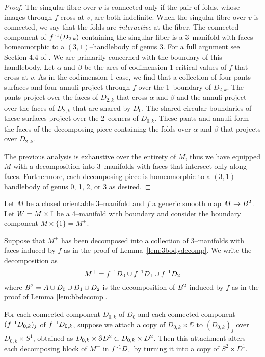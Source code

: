 \begin{proof}
	The singular fibre over $v$ is connected only if the pair of folds, whose images through $f$ cross at $v$, are both indefinite.
	When the singular fibre over $v$ is connected, we say that the folds are \emph{interactive} at the fiber.	
	The connected component of $f^{\,\text{-}1}(D_{2,k})$ containing the singular fiber is a 3--manifold with faces homeomorphic to a $(3,1)$--handlebody of genus 3.
	For a full argument see Section 4.4 of \cite{CostThur08}.
	We are primarily concerned with the boundary of this handlebody.
	Let $\alpha$ and $\beta$ be the arcs of codimension 1 critical values of $f$ that cross at $v$.
	As in the codimension 1 case, we find that a collection of four pants surfaces and four annuli project through $f$ over the 1--boundary of $D_{2,k}$.
	The pants project over the faces of $D_{2,k}$ that cross $\alpha$ and $\beta$ and the annuli project over the faces of $D_{2,k}$ that are shared by $D_0$.
	The shared circular boundaries of these surfaces project over the 2--corners of $D_{0,k}$.
	These pants and annuli form the faces of the decomposing piece containing the folds over $\alpha$ and $\beta$ that projects over $D_{2,k}$.
	
	The previous analysis is exhaustive over the entirety of $M$, thus we have equipped $M$ with a decomposition into 3--manifolds with faces that intersect only along faces.
	Furthermore, each decomposing piece is homeomorphic to a $(3,1)$--handlebody of genus 0, 1, 2, or 3 as desired.
\end{proof}



\begin{lem}
	\label{lem:3body2handle}
	Let $M$ be a closed orientable 3--manifold and $f$ a generic smooth map $M\to B^2$.
	Let $W=M\times\mathbb{I}$ be a 4--manifold with boundary and consider the boundary component $M\times\{1\}=M^+$.
	
	Suppose that $M^+$ has been decomposed into a collection of 3--manifolds with faces induced by $f$ as in the proof of Lemma~\ref{lem:3bodydecomp}.
	We write the decomposition as
	\[
		M^+ = f^{\,\text{-}1} D_0\cup f^{\,\text{-}1} D_1\cup f^{\,\text{-}1} D_2
	\]
	where $B^2=A\cup D_0\cup D_1\cup D_2$ is the decomposition of $B^2$ induced by $f$ as in the proof of Lemma \ref{lem:bbdecomp}.
	
	For each connected component $D_{0,k}$ of $D_0$ and each connected component $(f^{\,\text{-}1} D_{0,k})_j$ of $f^{\,\text{-}1} D_{0,k}$, suppose we attach a copy of $D_{0,k}\times\DD$ to $(D_{0,k})_j$ over $D_{0,k}\times S^1$, obtained as $D_{0,k}\times \partial D^2\subset D_{0,k}\times D^2$.
	Then this attachment alters each decomposing block of $M^+$ in $f^{\,\text{-}1} D_1$ by turning it into a copy of $S^2\times D^1$.
\end{lem}

